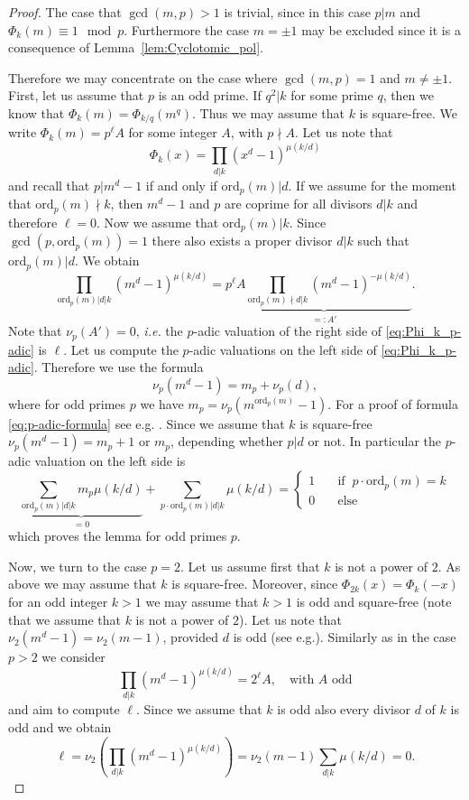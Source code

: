\documentclass{amsart}
\theoremstyle{plain}
\numberwithin{equation}{section}
\theoremstyle{remark}
\begin{document}
\begin{proof}
  The case that $\gcd(m,p)>1$ is trivial, since in this case $p|m$ and
  $\Phi_k(m)\equiv 1 \mod p$. Furthermore the case $m=\pm 1$ may be
  excluded since it is a consequence of
  Lemma~\ref{lem:Cyclotomic_pol}.

  Therefore we may concentrate on the case where $\gcd(m,p)=1$ and
  $m\neq\pm1$. First, let us assume that $p$ is an odd prime. If
  $q^2|k$ for some prime $q$, then we know that
  $\Phi_k(m)=\Phi_{k/q}(m^q)$. Thus we may assume that $k$ is
  square-free. We write $\Phi_k(m)=p^\ell A$ for some integer $A$, with $p\nmid A$. Let us
  note that
  \[\Phi_k(x)=\prod_{d|k} (x^d-1)^{\mu(k/d)}\]
  and recall that $p|m^d-1$ if and only if ${\mathrm{ord}}_p(m)|d$. If we
  assume for the moment that ${\mathrm{ord}}_p(m)\nmid k$, then $m^d-1$ and $p$
  are coprime for all divisors $d|k$ and therefore $\ell=0$. Now we
  assume that ${\mathrm{ord}}_p(m)|k$. Since $\gcd(p,{\mathrm{ord}}_p(m))=1$ there also
  exists a proper divisor $d|k$ such that ${\mathrm{ord}}_p(m)|d$. We obtain
\begin{equation}\label{eq:Phi_k_p-adic}
\prod_{{\mathrm{ord}}_p(m)|d|k} (m^d-1)^{\mu(k/d)} = p^\ell \underbrace{A \prod_{{\mathrm{ord}}_p(m)\nmid d|k} (m^d-1)^{-\mu(k/d)}}_{=:A'}.
\end{equation}
Note that $\nu_p(A')=0$, \textit{i.e.} the $p$-adic valuation of the right side of \eqref{eq:Phi_k_p-adic} is $\ell$. Let us compute the $p$-adic 
valuations on the left side of \eqref{eq:Phi_k_p-adic}.
Therefore we use the formula
\begin{equation}\label{eq:p-adic-formula}
 \nu_p(m^d-1)=m_p+\nu_p(d),
\end{equation}
where for odd primes $p$ we have $m_p=\nu_p(m^{{\mathrm{ord}}_p(m)}-1)$. For a proof of formula \eqref{eq:p-adic-formula} see e.g. \cite[Section 2.1.4, Lemma 
2.1.22]{Cohen:NTI}. Since we assume that $k$ is square-free $\nu_p(m^d-1)=m_p+1$ or $m_p$, depending 
whether $p|d$ or not. In particular the $p$-adic valuation on the left side is
$$\underbrace{\sum_{{\mathrm{ord}}_p(m)|d|k} m_p\mu(k/d)}_{=0}+\sum_{p\cdot {\mathrm{ord}}_p(m)|d|k} \mu(k/d)=\left\{ \begin{array}{cl} 1 & \quad \text{if}\;\; 
p\cdot {\mathrm{ord}}_p(m)=k\\
0 & \quad \text{else}\end{array} \right.     
$$
which proves the lemma for odd primes $p$.

Now, we turn to the case $p=2$. Let us assume first that $k$ is not a power of $2$. As above we may assume that $k$ is square-free. Moreover, since 
$\Phi_{2k}(x)=\Phi_k(-x)$ for an odd integer $k>1$ we may assume that $k>1$ is odd and square-free (note that we assume that $k$ is not a power of $2$). Let us 
note that $\nu_2(m^d-1)=\nu_2(m-1)$, provided $d$ is odd (see e.g.\cite[Section 2.1.4, Corollary 2.1.23]{Cohen:NTI}).
Similarly as in the case $p>2$ we consider 
$$\prod_{d|k} (m^d-1)^{\mu(k/d)} = 2^\ell A,\quad \text{with $A$ odd}$$
and aim to compute $\ell$.
Since we assume that $k$ is odd also every divisor $d$ of $k$ is odd and we obtain
$$\ell=\nu_2\left(\prod_{d|k} (m^d-1)^{\mu(k/d)}\right)= \nu_2(m-1) \sum_{d|k}\mu(k/d)=0.$$


\end{proof}
\end{document}
